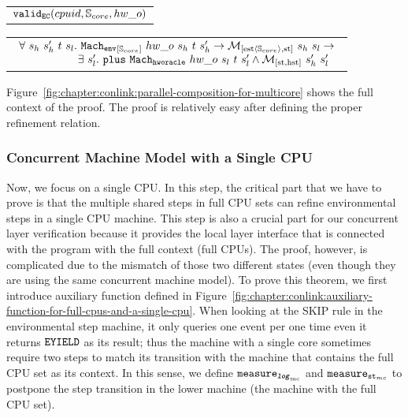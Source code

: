 \begin{hypothesis}
\begin{tabular}{P{0.95\textwidth}}
${{\mathrm{\texttt{valid}}}_{{\mathrm{\texttt{EC}}}}}({cpuid}, {{\mathbb{S}_{core}}}, {hw\_o })$\\
\end{tabular}
\end{hypothesis}

\begin{lemma}
\begin{tabular}{P{0.95\textwidth}}
$
\begin{array}{l}
\forall \ s_h \ s_h' \ t \ s_l . \ {{{\mathrm{\texttt{Mach}}}_{{\mathrm{\texttt{env}}}}}_{[{{\mathbb{S}_{core}}}]}~{hw\_o }~{s_h}~{t}~{s_h'}} \rightarrow  {{\mathcal{M}_{[\mathrm{est}\langle{\mathbb{S}_{core}}\rangle,\mathrm{st}]}}~{s_h}~{s_l}} \rightarrow \\
\ \ \ \ \ \ \ \ \ \ \ \ \ \ \ \ \exists\ s_l' . \  {{{\mathrm{\texttt{plus}}}}~{{{{{\mathrm{\texttt{Mach}}}_{{\mathrm{\texttt{hworacle}}}}}}~{hw\_o }~{s_l}~{t}~{s_l'}}}} \wedge  {{\mathcal{M}_{[\mathrm{st},\mathrm{hst}]}}~{s_h'}~{s_l'}}\\
\end{array}
$\\
\end{tabular}
\end{lemma}

Figure~\ref{fig:chapter:conlink:parallel-composition-for-multicore} shows the full context of the proof. 
The proof is relatively easy after defining the proper refinement relation. 

\subsubsection{Concurrent Machine Model with a Single CPU}


Now, we focus on a single CPU. 
In this step, 
the critical part that we have to prove is that the multiple shared steps in full CPU sets can
 refine environmental steps in a single CPU machine.
This step is also a crucial part for our concurrent layer verification because
it provides the local layer interface that is connected with the program with the full context (full CPUs).
The proof, however, is complicated due to the mismatch of those two different states (even though they are 
using the same concurrent machine model).
To prove this theorem, 
we first introduce auxiliary function defined in Figure~\ref{fig:chapter:conlink:auxiliary-function-for-full-cpus-and-a-single-cpu}. 
When looking at the \textsf{SKIP} rule in the environmental step machine, 
it only queries one event per one time even it returns ${{\mathrm{\texttt{EYIELD}}}}$ as its result;
thus the machine with a single core sometimes require two steps to match its transition with the machine that contains the full CPU set as its context. 
In this sense, we define ${{\mathrm{\texttt{measure}}}_{{{\mathrm{\texttt{\textbf{\textit{log}}}}}_{\mathrm{mc}}}}}$ and ${{\mathrm{\texttt{measure}}}_{{\mathrm{\texttt{st}}}_{mc}}}$ to postpone the step transition in the lower machine (the machine with the full CPU set). 

